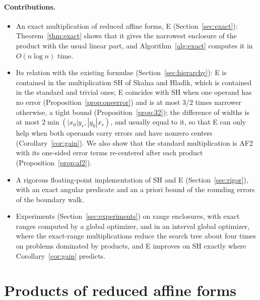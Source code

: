 \documentclass[10pt]{article}
\theoremstyle{definition}
\begin{document}
\paragraph{Contributions.}
\begin{itemize}
\item An exact multiplication of reduced affine forms, E (Section~\ref{sec:exact}): Theorem~\ref{thm:exact} shows that it gives the narrowest enclosure of the product with the usual linear part, and Algorithm~\ref{alg:exact} computes it in $O(n\log n)$ time.
\item Its relation with the existing formulae (Section~\ref{sec:hierarchy}): E is contained in the multiplication SH of Skalna and Hlad\'{\i}k, which is contained in the standard and trivial ones; E coincides with SH when one operand has no error (Proposition~\ref{prop:oneerror}) and is at most $3/2$ times narrower otherwise, a tight bound (Proposition~\ref{prop:32}); the difference of widths is at most $2\min(|x_0|y_r,|y_0|x_r)$, and usually equal to it, so that E can only help when both operands carry errors and have nonzero centers (Corollary~\ref{cor:gain}). We also show that the standard multiplication is AF2~\cite{messine2002extentions} with its one-sided error terms re-centered after each product (Proposition~\ref{prop:af2}).
\item A rigorous floating-point implementation of SH and E (Section~\ref{sec:rigor}), with an exact angular predicate and an a priori bound of the rounding errors of the boundary walk.
\item Experiments (Section~\ref{sec:experiments}) on range enclosures, with exact ranges computed by a global optimizer, and in an interval global optimizer, where the exact-range multiplications reduce the search tree about four times on problems dominated by products, and E improves on SH exactly where Corollary~\ref{cor:gain} predicts.
\end{itemize}

\section{Products of reduced affine forms}
\label{sec:products}
\end{document}
